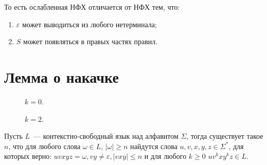 То есть ослабленная НФХ отличается от НФХ тем, что:
\begin{enumerate}
    \item $\varepsilon$ может выводиться из любого нетерминала;
    \item $S$ может появляться в правых частях правил.
\end{enumerate}


\section{Лемма о накачке}

\begin{marginfigure}
    \centering
    
    \caption{Разбиение цепочки для леммы о накачке}
    \label{fig:pumping1}
\end{marginfigure}

\begin{marginfigure}
    \begin{center}
        \begin{subfigure}{\marginparwidth}
            \centering
            
            \caption{$k = 0$.}
        \end{subfigure}

        \begin{subfigure}{\linewidth}
            \centering
            
            \caption{$k = 2$.}
        \end{subfigure}
    \end{center}
    \caption{Пример накачки цепочки с рисунка~\ref{fig:pumping1}}
    \label{fig:pumping2}
\end{marginfigure}

\begin{lemma}
    Пусть $L$~--- контекстно-свободный язык над алфавитом $\Sigma$, тогда существует такое $n$, что для любого слова $\omega \in L$, $|\omega| \geq n$ найдутся слова $u,v,x,y,z\in \Sigma^*$, для которых верно: $uvxyz = \omega, vy\neq \varepsilon,|vxy|\leq n$ и для любого $k \geq 0$  $uv^kxy^kz \in L$.
\end{lemma}

